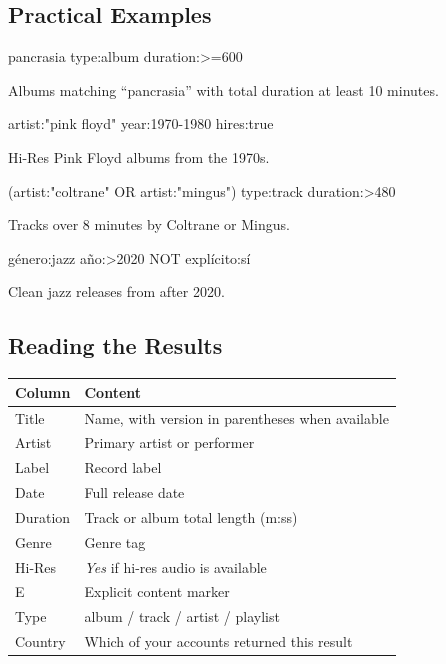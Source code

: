 \documentclass[11pt,a4paper]{article}
\begin{document}
\subsection{Practical Examples}

\begin{cmdbox}
pancrasia type:album duration:>=600
\end{cmdbox}
Albums matching ``pancrasia'' with total duration at least 10 minutes.

\begin{cmdbox}
artist:"pink floyd" year:1970-1980 hires:true
\end{cmdbox}
Hi-Res Pink Floyd albums from the 1970s.

\begin{cmdbox}
(artist:"coltrane" OR artist:"mingus") type:track duration:>480
\end{cmdbox}
Tracks over 8 minutes by Coltrane or Mingus.

\begin{cmdbox}
género:jazz año:>2020 NOT explícito:sí
\end{cmdbox}
Clean jazz releases from after 2020.

\subsection{Reading the Results}

\begin{center}
\begin{tabular}{@{}ll@{}}
\toprule
\textbf{Column}  & \textbf{Content} \\
\midrule
Title    & Name, with version in parentheses when available \\
Artist   & Primary artist or performer \\
Label    & Record label \\
Date     & Full release date \\
Duration & Track or album total length (m:ss) \\
Genre    & Genre tag \\
Hi-Res   & \emph{Yes} if hi-res audio is available \\
E        & Explicit content marker \\
Type     & album / track / artist / playlist \\
Country  & Which of your accounts returned this result \\
\bottomrule
\end{tabular}
\end{center}
\end{document}

